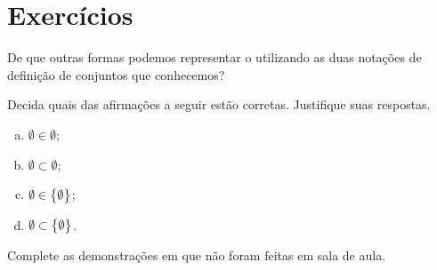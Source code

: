 \section{Exercícios}

\begin{exercise}
\label{exe:vazio-notacao}
	De que outras formas podemos representar o  utilizando as duas notações de definição de conjuntos que conhecemos?
\end{exercise}


\begin{exercise}
\label{exe:vazios-tricky}
	Decida quais das afirmações a seguir estão corretas. Justifique suas respostas.
	\begin{enumerate}[a.]
		\item $\emptyset \in \emptyset$;
		\item $\emptyset \subset \emptyset$;
		\item $\emptyset \in \left\{ \emptyset\right\}$;
		\item $\emptyset \subset \left\{ \emptyset\right\}$.
	\end{enumerate}
\end{exercise}

\begin{comment}
\begin{exercise}
Demonstre as seguintes propriedades sobre os conjuntos arbitrários $A$, $B$ e $C$.

\begin{tip}
Ao demonstrar uma propriedade você tem o direito de usá-la para demonstrar as outras)
\end{tip}

\begin{enumerate}[a.]
\item $A \subset A$
\item $A \subset A \cup B$
\item $A \cup (B \cap C) = (A \cup B) \cap (A \cup C)$
\item $A \cap (B \cup C) = (A \cap B) \cup (A \cap C)$
\item $(A \cup B)^C = A^C \cap B^C$
\item $(A \cap B)^C = A^C \cup B^C$
\item $(A^C)^C = A$	
\item $A \cap (A \cup B) = A$
\item $A \cup (A \cap B) = A$
\end{enumerate}
\end{exercise}
\end{comment}
\begin{exercise}
Complete as demonstrações em  que não foram feitas em sala de aula.
\end{exercise}


